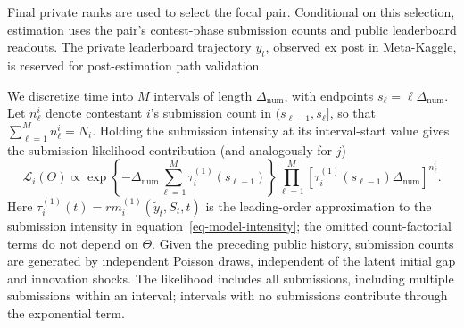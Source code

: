 \documentclass[mnsc]{informs3}
\begin{document}
{Final private ranks are used to select the focal pair. Conditional on this selection, estimation uses the pair's contest-phase submission counts and public leaderboard readouts. The private leaderboard trajectory $y_t$, observed ex post in Meta-Kaggle, is reserved for post-estimation path validation.}

{We discretize time into $M$ intervals of length $\Delta_{\mathrm{num}}$, with endpoints $s_\ell=\ell\Delta_{\mathrm{num}}$. Let $n^i_\ell$ denote contestant $i$'s submission count in $(s_{\ell-1},s_\ell]$, so that $\sum_{\ell=1}^M n^i_\ell=N_i$. Holding the submission intensity at its interval-start value gives the submission likelihood contribution (and analogously for $j$)}
\begin{equation}\label{eq-ihpp-prob}
{\mathcal L_i(\Theta)
\propto
\exp\!\left\{-\Delta_{\mathrm{num}}\sum_{\ell=1}^M\tau_i^{(1)}(s_{\ell-1})\right\}
\prod_{\ell=1}^M
\left[\tau_i^{(1)}(s_{\ell-1})\Delta_{\mathrm{num}}\right]^{n^i_\ell}.}
\end{equation}
{Here $\tau_i^{(1)}(t)=r m_i^{(1)}(\tilde y_t,S_t,t)$ is the leading-order approximation to the submission intensity in equation~\eqref{eq-model-intensity}; the omitted count-factorial terms do not depend on $\Theta$. Given the preceding public history, submission counts are generated by independent Poisson draws, independent of the latent initial gap and innovation shocks. The likelihood includes all submissions, including multiple submissions within an interval; intervals with no submissions contribute through the exponential term.}
\end{document}

